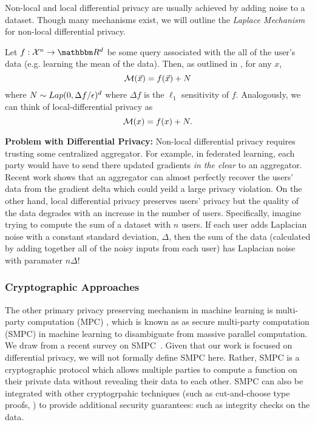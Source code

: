 \documentclass[11pt]{article}
\begin{document}
Non-local and local differential privacy are usually achieved by adding noise to a dataset.
Though many mechanisms exist, we will outline the \emph{Laplace Mechanism} for non-local differential privacy.

Let $f: \mathcal{X}^n \rightarrow \R^d$ be some query associated with the all of the user's data (e.g. learning the mean of the data).
Then, as outlined in \cite{Bassily_2015}, for any $x$,
\[
	\mathcal{M}(\vec{x}) = f(\vec{x}) + N
\]
where $N \sim Lap(0, \Delta f/ \epsilon)^{d}$ where $\Delta f$ is the $\ell_1$ sensitivity of $f$.
Analogously, we can think of local-differential privacy as \[
	\mathcal{M}(x) = f(x) + N.
\]

\textbf{Problem with Differential Privacy:} Non-local differential privacy requires trusting some centralized aggregator.
For example, in federated learning, each party would have to send there updated gradients \emph{in the clear} to an aggregator.
Recent work \cite{gupta2022recoveringprivatetextfederated} shows that an aggregator can almost perfectly recover the users' data from the gradient delta which could yeild a large privacy violation.
On the other hand, local differential privacy preserves users' privacy but the quality of the data degrades with an increase in the number of users.
Specifically, imagine trying to compute the sum of a dataset with $n$ users.
If each user adds Laplacian noise with a constant standard deviation, $\Delta$, then the sum of the data (calculated by adding together all of the noisy inputs from each user) has Laplacian noise with paramater $n \Delta$!

\subsubsection*{Cryptographic Approaches}
The other primary privacy preserving mechanism in machine learning is multi-party computation (MPC) \cite{yao1986generate}, which is known as as secure multi-party computation (SMPC) in machine learning to disambiguate from massive parallel computation.
We draw from a recent survey on SMPC~\cite{zhou2024secure}.
Given that our work is focused on differential privacy, we will not formally define SMPC here.
Rather, SMPC is a cryptographic protocol which allows multiple parties to compute a function on their private data without revealing their data to each other.
SMPC can also be integrated with other cryptogrpahic techniques (such as cut-and-choose type proofs, \cite{lindell2016fast}) to provide additional security guarantees: such as integrity checks on the data.
\end{document}
